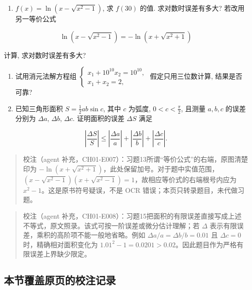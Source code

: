 \documentclass[
  10pt,
  fontset=fandol]{ctexart}
\providecommand{\tightlist}{%
  \setlength{\itemsep}{0pt}\setlength{\parskip}{0pt}}
\begin{document}
\begin{enumerate}
\def\labelenumi{\arabic{enumi}.}
\setcounter{enumi}{12}
\tightlist
\item
  \(f(x)=\ln(x-\sqrt{x^2-1})\), 求 \(f(30)\) 的值. 求对数时误差有多大? 若改用另一等价公式
\end{enumerate}

\[
\ln(x-\sqrt{x^2-1})=-\ln(x+\sqrt{x^2+1})
\]

计算, 求对数时误差有多大?

\begin{enumerate}
\def\labelenumi{\arabic{enumi}.}
\setcounter{enumi}{13}
\item
  试用消元法解方程组 \(\begin{cases} x_1+10^{10}x_2=10^{10}, \\ x_1+x_2=2, \end{cases}\) 假定只用三位数计算, 结果是否可靠?
\item
  已知三角形面积 \(S=\frac{1}{2}ab\sin c\), 其中 \(c\) 为弧度, \(0<c<\frac{\pi}{2}\), 且测量 \(a, b, c\) 的误差分别为 \(\Delta a\), \(\Delta b\), \(\Delta c\). 证明面积的误差 \(\Delta S\) 满足
\end{enumerate}

\[
\left|\frac{\Delta S}{S}\right| \leqslant \left|\frac{\Delta a}{a}\right| + \left|\frac{\Delta b}{b}\right| + \left|\frac{\Delta c}{c}\right|.
\]

\begin{quote}
校注（agent 补充，CH01-E007）：习题13所谓``等价公式''的右端，原图清楚印为 \(-\ln(x+\sqrt{x^2+1})\)，此处保留加号。对于题中实值范围，\((x-\sqrt{x^2-1})(x+\sqrt{x^2-1})=1\)，故相应等价式的右端根号内应为 \(x^2-1\)。这是原书符号疑误，不是 OCR 错误；本页只转录题目，未代做习题。
\end{quote}

\begin{quote}
校注（agent 补充，CH01-E008）：习题15把面积的有限误差直接写成上述不等式，原文照录。该式可按一阶误差或微分估计理解；若 \(\Delta\) 表示有限误差，乘积的高阶项不能一般地省略。例如 \(\Delta a/a=\Delta b/b=0.01\) 且 \(\Delta c=0\) 时，精确相对面积变化为 \(1.01^2-1=0.0201>0.02\)。因此题目作为严格有限误差上界缺少限定。
\end{quote}

\subsection{本节覆盖原页的校注记录}\label{ux672cux8282ux8986ux76d6ux539fux9875ux7684ux6821ux6ce8ux8bb0ux5f55}
\end{document}
